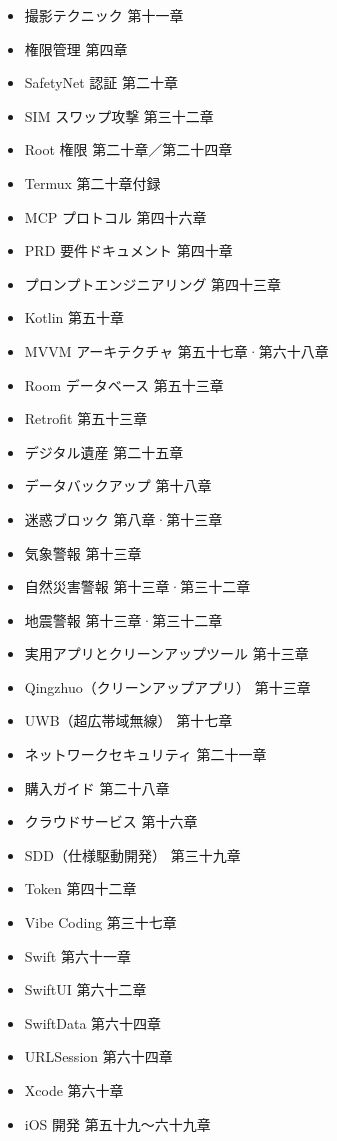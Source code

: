 
\begin{itemize}
  \item 撮影テクニック 第十一章
  \item 権限管理 第四章
  \item SafetyNet 認証 第二十章
  \item SIM スワップ攻撃 第三十二章
  \item Root 権限 第二十章／第二十四章
  \item Termux 第二十章付録
  \item MCP プロトコル 第四十六章
  \item PRD 要件ドキュメント 第四十章
  \item プロンプトエンジニアリング 第四十三章
  \item Kotlin 第五十章
  \item MVVM アーキテクチャ 第五十七章·第六十八章
  \item Room データベース 第五十三章
  \item Retrofit 第五十三章
\end{itemize}


\begin{itemize}
  \item デジタル遺産 第二十五章
  \item データバックアップ 第十八章
  \item 迷惑ブロック 第八章·第十三章
  \item 気象警報 第十三章
  \item 自然災害警報 第十三章·第三十二章
  \item 地震警報 第十三章·第三十二章
  \item 実用アプリとクリーンアップツール 第十三章
  \item Qingzhuo（クリーンアップアプリ） 第十三章
  \item UWB（超広帯域無線） 第十七章
  \item ネットワークセキュリティ 第二十一章
  \item 購入ガイド 第二十八章
  \item クラウドサービス 第十六章
  \item SDD（仕様駆動開発） 第三十九章
  \item Token 第四十二章
  \item Vibe Coding 第三十七章
  \item Swift 第六十一章
  \item SwiftUI 第六十二章
  \item SwiftData 第六十四章
  \item URLSession 第六十四章
  \item Xcode 第六十章
  \item iOS 開発 第五十九〜六十九章
\end{itemize}

